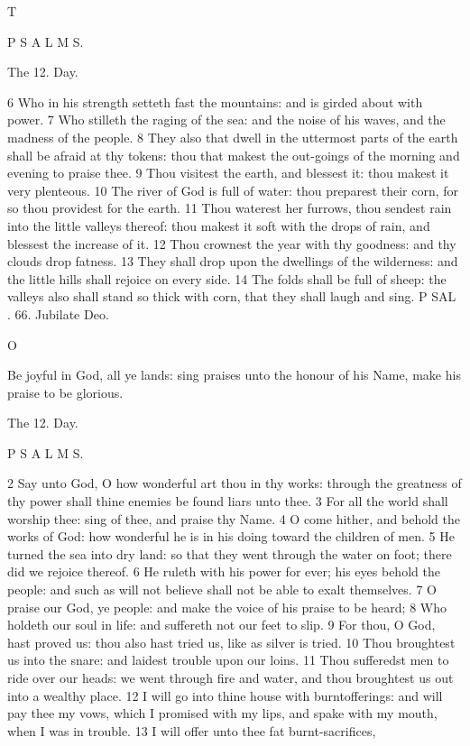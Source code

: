T

P S A L M S.

The 12. Day.

6 Who in his strength setteth fast the mountains: and is girded about with power. 7 Who stilleth the raging of the sea: and the noise of his waves, and the madness of the people. 8 They also that dwell in the uttermost parts of the earth shall be afraid at thy tokens: thou that makest the out-goings of the morning and evening to praise thee. 9 Thou visitest the earth, and blessest it: thou makest it very plenteous. 10 The river of God is full of water: thou preparest their corn, for so thou providest for the earth. 11 Thou waterest her furrows, thou sendest rain into the little valleys thereof: thou makest it soft with the drops of rain, and blessest the increase of it. 12 Thou crownest the year with thy goodness: and thy clouds drop fatness. 13 They shall drop upon the dwellings of the wilderness: and the little hills shall rejoice on every side. 14 The folds shall be full of sheep: the valleys also shall stand so thick with corn, that they shall laugh and sing. P SAL . 66. Jubilate Deo.

O

Be joyful in God, all ye lands: sing praises unto the honour of his Name, make his praise to be glorious.

The 12. Day.

P S A L M S.

2 Say unto God, O how wonderful art thou in thy works: through the greatness of thy power shall thine enemies be found liars unto thee. 3 For all the world shall worship thee: sing of thee, and praise thy Name. 4 O come hither, and behold the works of God: how wonderful he is in his doing toward the children of men. 5 He turned the sea into dry land: so that they went through the water on foot; there did we rejoice thereof. 6 He ruleth with his power for ever; his eyes behold the people: and such as will not believe shall not be able to exalt themselves. 7 O praise our God, ye people: and make the voice of his praise to be heard; 8 Who holdeth our soul in life: and suffereth not our feet to slip. 9 For thou, O God, hast proved us: thou also hast tried us, like as silver is tried. 10 Thou broughtest us into the snare: and laidest trouble upon our loins. 11 Thou sufferedst men to ride over our heads: we went through fire and water, and thou broughtest us out into a wealthy place. 12 I will go into thine house with burntofferings: and will pay thee my vows, which I promised with my lips, and spake with my mouth, when I was in trouble. 13 I will offer unto thee fat burnt-sacrifices,

